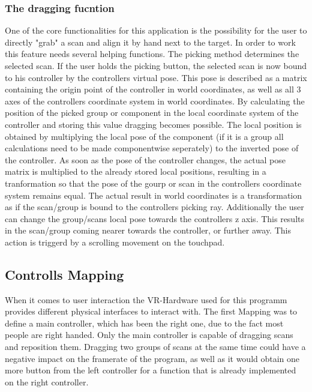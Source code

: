 \documentclass[hyperref,english,bachelorofscience,bibnum]{cgvpub}
\begin{document}
\subsubsection{The dragging fucntion}

One of the core functionalities for this application is the possibility for the user to directly "grab" a scan and align it by hand next to the target. In order to work this feature needs several helping functions. The picking method determines the selected scan. If the user holds the picking button, the selected scan is now bound to his controller by the controllers virtual pose. This pose is described as a matrix containing the origin point of the controller in world coordinates, as well as all 3 axes of the controllers coordinate system in world coordinates. By calculating the position of the picked group or component in the local coordinate system of the controller and storing this value dragging becomes possible. The local position is obtained by multiplying the local pose of the component (if it is a group all calculations need to be made componentwise seperately) to the inverted pose of the controller. As soon as the pose of the controller changes, the actual pose matrix is multiplied to the already stored local positions, resulting in a tranformation so that the pose of the gourp or scan in the controllers coordinate system remains equal. The actual result in world coordinates is a transformation as if the scan/group is bound to the controllers picking ray. Additionally the user can change the group/scans local pose towards the controllers z axis. This results in the scan/group coming nearer towards the controller, or further away. This action is triggerd by a scrolling movement on the touchpad. 

\subsection{Controlls Mapping}

When it comes to user interaction the VR-Hardware used for this programm provides different physical interfaces to interact with. 
The first Mapping was to define a main controller, which has been the right one, due to the fact most people are right handed. Only the main controller is capable of dragging scans and reposition them.
Dragging two groups of scans at the same time could have a negative impact on the framerate of the program, as well as it would obtain one more button from the left controller for a function that is already implemented on the right controller.
\end{document}
